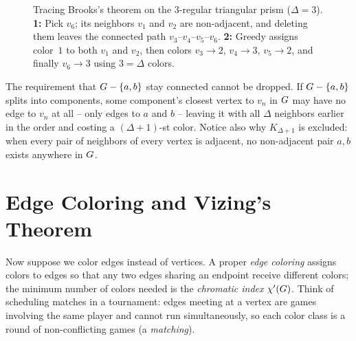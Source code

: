 \begin{figure}[htbp]
\caption{Tracing Brooks's theorem on the $3$-regular triangular prism ($\Delta=3$). \textbf{1:} Pick $v_6$; its neighbors $v_1$ and $v_2$ are non-adjacent, and deleting them leaves the connected path $v_3$--$v_4$--$v_5$--$v_6$. \textbf{2:} Greedy assigns color~$1$ to both $v_1$ and $v_2$, then colors $v_3\to 2$, $v_4\to 3$, $v_5\to 2$, and finally $v_6\to 3$ using $3=\Delta$ colors.}
\label{ch28:fig-brooks-example}
\end{figure}

\begin{trapbox}
The requirement that $G-\{a,b\}$ stay connected cannot be dropped. If $G-\{a,b\}$ splits into components, some component's closest vertex to $v_n$ in $G$ may have no edge to $v_n$ at all -- only edges to $a$ and $b$ -- leaving it with all $\Delta$ neighbors earlier in the order and costing a $(\Delta+1)$-st color. Notice also why $K_{\Delta+1}$ is excluded: when every pair of neighbors of every vertex is adjacent, no non-adjacent pair $a,b$ exists anywhere in $G$.
\end{trapbox}

\section{Edge Coloring and Vizing's Theorem}
\label{ch28:vizing}

Now suppose we color edges instead of vertices. A proper \emph{edge coloring} assigns colors to
edges so that any two edges sharing an endpoint receive different colors; the minimum number of colors needed is the
\emph{chromatic index} $\chi'(G)$. Think of scheduling matches in a
tournament: edges meeting at a vertex are games involving the same player and
cannot run simultaneously, so each color class is a round of non-conflicting games (a \emph{matching}).

